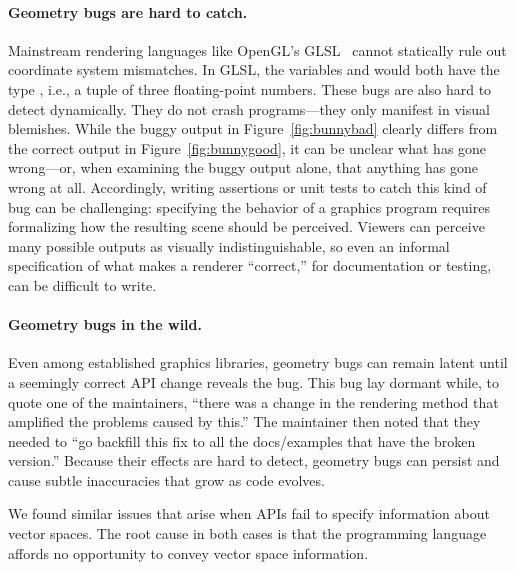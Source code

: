 \paragraph{Geometry bugs are hard to catch.}

Mainstream rendering languages like OpenGL's GLSL~\cite{opengl} cannot statically rule out coordinate system mismatches.
In GLSL, the variables  and  would both have the type , i.e., a tuple of three floating-point numbers.
%
These bugs are also hard to detect dynamically.
They do not crash programs---they only manifest in visual blemishes.
While the buggy output in Figure~\ref{fig:bunnybad} clearly differs from the correct output in Figure~\ref{fig:bunnygood}, it can be unclear what has gone wrong---or, when examining the buggy output alone, that anything has gone wrong at all.
Accordingly, writing assertions or unit tests to catch this kind of bug can be challenging: specifying the behavior of a graphics program requires formalizing how the resulting scene should be perceived.
Viewers can perceive many possible outputs as visually indistinguishable, so even an informal specification of what makes a renderer ``correct,'' for documentation or testing, can be difficult to write.

\paragraph{Geometry bugs in the wild.}

Even among established graphics libraries, geometry bugs can remain latent until a seemingly correct API change reveals the bug.
This bug lay dormant while, to quote one of the maintainers, ``there was a change in the rendering method that amplified the problems caused by this.'' The maintainer then noted that they needed to ``go backfill this fix to all the docs/examples that have the broken version.''
Because their effects are hard to detect, geometry bugs can persist and cause subtle inaccuracies that grow as code evolves.

We found similar issues that arise when APIs fail to specify information about vector spaces.
The root cause in both cases is that the programming language affords no opportunity to convey vector space information.

